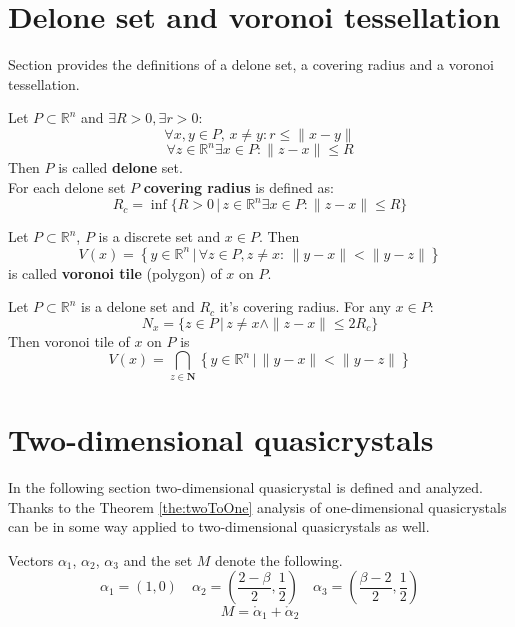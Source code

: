 \documentclass[text.tex]{subfiles}
\begin{document}
\section*{Delone set and voronoi tessellation}

Section provides the definitions of a delone set, a covering radius and a voronoi tessellation.

\begin{definition}
\label{def:delone}
Let $P\subset \mathbb{R}^n$ and $\exists R>0, \exists r>0$:
$$\forall x,y\in P,\, x\neq y: r\leq \|x-y\|$$
$$\forall z\in\mathbb{R}^n \exists x\in P: \|z-x\|\leq R$$
Then $P$ is called \textbf{delone} set.\\
For each delone set $P$ \textbf{covering radius} is defined as:
$$R_c = \inf\{R>0\,|\, z\in\mathbb{R}^n \exists x\in P: \|z-x\|\leq R\}$$
\end{definition}

\begin{definition}
Let $P\subset \mathbb{R}^n$, $P$ is a discrete set and $x\in P$. Then
$$V(x) = \left\{ y \in \mathbb{R}^n \,|\, \forall z \in P, z\neq x:\, \|y-x\|<\|y-z\| \right\}$$
is called \textbf{voronoi tile} (polygon) of $x$ on $P$.
\end{definition}

\begin{theorem}
\label{the:radiusLimit}
Let $P\subset \mathbb{R}^n$ is a delone set and $R_c$ it's covering radius. For any $x\in P$:
$$N_x = \{z\in P\,|\, z\neq x \wedge \|z-x\|\leq 2R_c\}$$
Then voronoi tile of $x$ on $P$ is
$$V(x) = \bigcap_{z\in \boldsymbol{N}} \left\{ y \in \mathbb{R}^n \,|\, \|y-x\|<\|y-z\| \right\}$$
\end{theorem}

\section{Two-dimensional quasicrystals}%
\label{sec:twoDimension}
In the following section two-dimensional quasicrystal is defined and analyzed. Thanks to the Theorem \ref{the:twoToOne} analysis of one-dimensional quasicrystals can be in some way applied to two-dimensional quasicrystals as well. 
\begin{definition}
Vectors $\alpha_1$, $\alpha_2$, $\alpha_3$ and the set $M$ denote the following.
$$\alpha_1 = \left( 1,0 \right) \quad \alpha_2 = \left( \frac{2-\beta}{2}, \frac{1}{2} \right) \quad \alpha_3 = \left( \frac{\beta-2}{2}, \frac{1}{2} \right)$$
$$M = \ring\alpha_1 + \ring\alpha_2$$
\end{definition}
\end{document}
